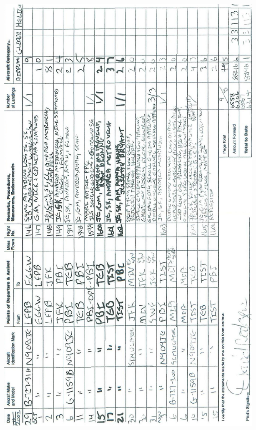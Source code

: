 \documentclass[10pt]{article}
\begin{document}
\includegraphics[max width=\textwidth, center]{2025_02_27_dd68c3d38de88f0516d9g-101}
\end{document}
